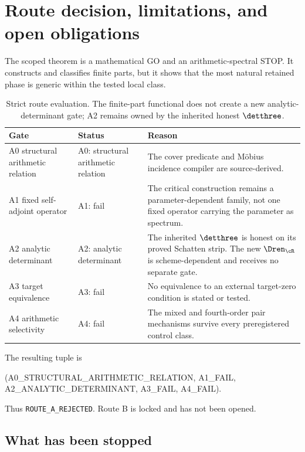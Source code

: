 \section{Route decision, limitations, and open obligations}
\label{sec:route}

The scoped theorem is a mathematical GO and an arithmetic-spectral STOP.
It constructs and classifies finite parts, but it shows that the most natural
retained phase is generic within the tested local class.

\begin{table}[H]
\centering
\small
\caption{Strict route evaluation.  The finite-part functional does not create
a new analytic-determinant gate; A2 remains owned by the inherited honest
$\detthree$.}
\label{tab:route}
\begin{tabularx}{\textwidth}{L{0.20\textwidth}L{0.19\textwidth}Y}
\toprule
Gate & Status & Reason\\
\midrule
A0 structural arithmetic relation &
A0: structural arithmetic relation &
The cover predicate and M\"obius incidence compiler are source-derived.\\
A1 fixed self-adjoint operator & A1: fail &
The critical construction remains a parameter-dependent family, not one
fixed operator carrying the parameter as spectrum.\\
A2 analytic determinant & A2: analytic determinant &
The inherited $\detthree$ is honest on its proved Schatten strip.  The new
$\Dren_{\cR}$ is scheme-dependent and receives no separate gate.\\
A3 target equivalence & A3: fail &
No equivalence to an external target-zero condition is stated or tested.\\
A4 arithmetic selectivity & A4: fail &
The mixed and fourth-order pair mechanisms survive every preregistered
control class.\\
\bottomrule
\end{tabularx}
\end{table}

The resulting tuple is
\begin{center}
\small\ttfamily
(A0\_STRUCTURAL\_ARITHMETIC\_RELATION, A1\_FAIL,\\
A2\_ANALYTIC\_DETERMINANT, A3\_FAIL, A4\_FAIL).
\end{center}
Thus \texttt{ROUTE\_A\_REJECTED}.  Route B is locked and has not been opened.

\subsection{What has been stopped}

